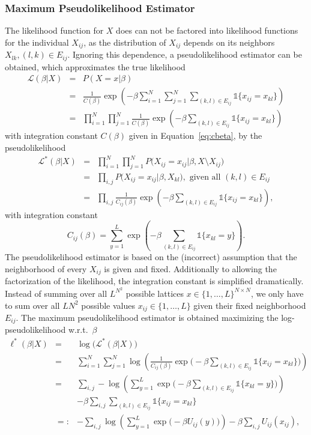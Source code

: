 \documentclass[12pt, twoside]{article}
\newcommand{\1}{\mathbb{1}}
\newcommand{\LL}{\mathcal{L}}
\begin{document}
\subsubsection{Maximum Pseudolikelihood Estimator}\label{MPLE_estimator}
The likelihood function for $X$ does can not be factored into likelihood functions for the individual $X_{ij}$, as the distribution of $X_{ij}$ depends on its neighbors $X_{lk}, (l,k) \in E_{ij}$.
Ignoring this dependence, a pseudolikelihood estimator can be obtained, which approximates the true likelihood
\begin{eqnarray}
\LL(\beta | X) &=& P(X = x | \beta) \nonumber \\
&=& \frac{1}{C(\beta)} \exp \left(-\beta \sum_{i = 1}^N \sum_{j = 1}^N \sum_{(k,l) \in E_{ij}} \1 \{x_{ij} = x_{kl}\} \right) \nonumber \\
&=& \prod_{i = 1}^N \prod_{j = 1}^N \frac{1}{C(\beta)} \exp\left(-\beta \sum_{(k,l) \in E_{ij}} \1 \{x_{ij} = x_{kl}\}\right)
\end{eqnarray}
with integration constant $C(\beta)$ given in Equation~\eqref{eq:cbeta},
by the pseudolikelihood
\begin{eqnarray}
\LL^*(\beta | X) &=& \prod_{i = 1}^N \prod_{j = 1}^N P\big(X_{ij} = x_{ij} | \beta, X \setminus X_{ij}\big) \nonumber \\
&=& \prod_{i, j} P\big(X_{ij} = x_{ij} | \beta, X_{kl}\big), \text{ given all }(k, l) \in E_{ij} \nonumber \\
&=& \prod_{i, j} \frac{1}{C_{ij}(\beta)} \exp\left(-\beta \sum_{(k,l) \in E_{ij}} \1 \{x_{ij} = x_{kl}\}\right),
\end{eqnarray}
with integration constant
\begin{equation} \label{eq:cbeta_ij}
C_{ij}(\beta) = \sum_{y = 1}^L \exp\left( -\beta \sum_{(k, l) \in E_{ij}} \1\{x_{kl} = y\}\right).
\end{equation}
The pseudolikelihood estimator is based on the (incorrect) assumption that the neighborhood of every $X_{ij}$ is given and fixed. Additionally to allowing the factorization of the likelihood, the integration constant is simplified dramatically. Instead of summing over all $L^{N^2}$ possible lattices $x \in \{1, \ldots, L\}^{N\times N}$, we only have to sum over all $LN^2$ possible values $x_{ij} \in \{1, \ldots, L\}$ given their fixed neighborhood $E_{ij}$.
%
The maximum pseudolikelihood estimator is obtained maximizing the log-pseu\-do\-likeli\-hood w.r.t.\ $\beta$
\begin{eqnarray}
\ell^*(\beta | X) &=& \log \Big(\LL^*(\beta | X) \Big) \nonumber \\
&=& \sum_{i = 1}^N \sum_{j = 1}^N \log \left(\frac{1}{C_{ij}(\beta)} \exp \Big(-\beta \sum_{(k,l) \in E_{ij}} \1 \{x_{ij} = x_{kl}\}\Big) \right) \nonumber \\
&=& \sum_{i, j} -\log \left( \sum_{y = 1}^L \exp\Big(- \beta \sum_{(k,l) \in E_{ij}} \1\{x_{kl} = y\}\Big) \right) \nonumber\\
&& -  \beta \sum_{i, j} \sum_{(k,l) \in E_{ij}} \1 \{x_{ij} = x_{kl}\} \nonumber \\
&=:& -\sum_{i, j} \log \left( \sum_{y = 1}^L \exp\big(- \beta U_{ij}(y)\big) \right) -  \beta \sum_{i, j} U_{ij}(x_{ij}),
\end{eqnarray}
\end{document}
